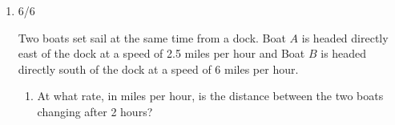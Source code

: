 \documentclass{article}
\begin{document}
\begin{enumerate}
\begin{enumerate}
\begin{solution}
    The hiker's elevation at time $t$ is $70+\int_0^t f(\tau)\,d\tau$ meters, so the hiker's elevation will be the same as when she started when $\int_0^t f(\tau)\,d\tau=0$. Using the graph, this occurs only at $t=2$.
\end{solution}

\end{enumerate}



\pspace{\newpage}

\item

\begin{grading}
    6/6
\end{grading}

\begin{problem}
 Two boats set sail at the same time from a dock. Boat $A$ is headed directly east of the dock at a speed of 2.5 miles per hour and Boat $B$ is headed directly south of the dock at a speed of 6 miles per hour.
 \end{problem}
 
\begin{enumerate}
    \item  
\begin{problem}
At what rate, in miles per hour, is the distance between the two boats changing after 2 hours?
\end{problem}
\pspace{\vfill}


\end{enumerate}
\end{enumerate}
\end{document}
